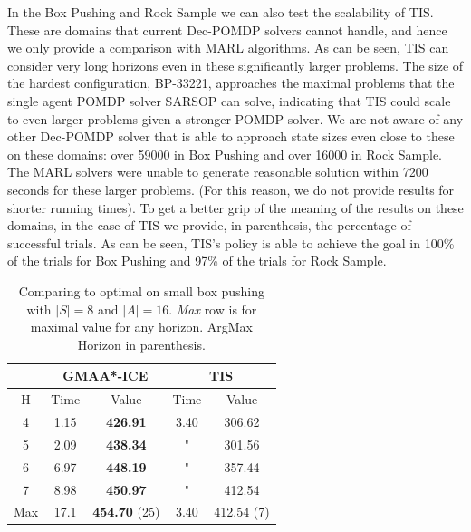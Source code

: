 \documentclass[runningheads]{llncs}
\begin{document}
In the Box Pushing and Rock Sample we can also test the scalability of TIS.
These are domains  that current Dec-POMDP solvers cannot handle, and
hence we only provide a comparison with MARL algorithms. 
As can be seen, TIS can consider very long horizons even in these significantly larger problems. The size of the hardest configuration, BP-33221, approaches the maximal problems that the single agent POMDP solver SARSOP can solve, indicating that TIS could scale to even larger problems given a stronger POMDP solver. 
We are not aware of any other Dec-POMDP solver that is able to approach state sizes  even close to these on these domains: over 59000 in Box Pushing and over 16000 in Rock Sample. The MARL solvers were unable to generate reasonable solution within 7200 seconds for these larger problems. (For this reason, we do not 
provide results for shorter running times). 
To get a better grip of the meaning of the results on these domains, in the case of TIS we provide, in parenthesis, the percentage of successful trials. As can be seen, TIS's policy is able to achieve the goal in 100\% of the trials for Box Pushing and 97\% of the trials for Rock Sample. 



\begin{table}[t]
\centering
\scriptsize
    \begin{tabular}{|c||c|c||c|c|}
         \hline
          &  \multicolumn{2}{c||}{GMAA*-ICE} & \multicolumn{2}{c|}{TIS}\\ 
         \hline
         H & Time & Value & Time & Value \\
         \hline
         4  & 1.15 & \textbf{426.91} & 3.40 & 306.62 \\
         \hline
         5  & 2.09 & {\bf 438.34} & " & 301.56 \\ 
         \hline
         6 & 6.97 & {\bf 448.19} & " & 357.44 \\
         \hline
         7  & 8.98 & {\bf 450.97} & " & 412.54 \\
         \hline
         Max  & 17.1 & \textbf{454.70} (25) & 3.40 & 412.54 (7) \\
         \hline
    \end{tabular}
    
    \caption{\label{tbl:small} Comparing to optimal on small
    box pushing with $|S|=8$ and $|A|=16$. {\em Max} row is for maximal value for any horizon. ArgMax Horizon in parenthesis.
    }
    \vspace{-4mm}
\end{table}
\end{document}

